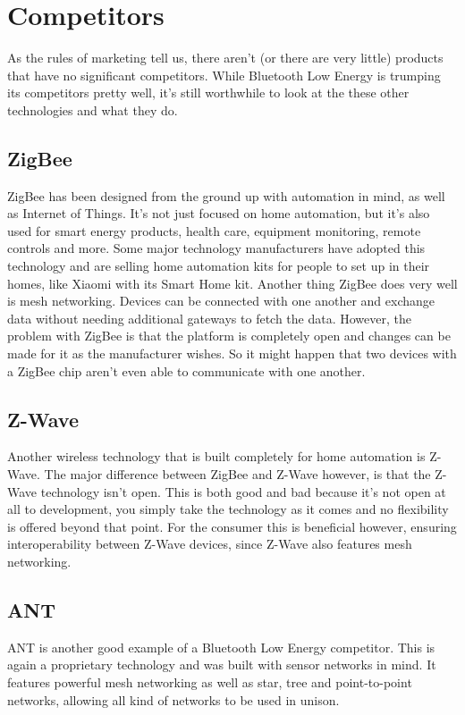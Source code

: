 \documentclass[pdftex,a4paper,12pt,twoside]{report}
\begin{document}
\section{Competitors}
\label{sec:competitors}
As the rules of marketing tell us, there aren't (or there are very little) products that have no significant competitors. While Bluetooth Low Energy is trumping its competitors pretty well, it's still worthwhile to look at the these other technologies and what they do.

\subsection{ZigBee}
\label{subsec:zigbee}
ZigBee has been designed from the ground up with automation in mind, as well as Internet of Things. It's not just focused on home automation, but it's also used for smart energy products, health care, equipment monitoring, remote controls and more. Some major technology manufacturers have adopted this technology and are selling home automation kits for people to set up in their homes, like Xiaomi with its Smart Home kit. Another thing ZigBee does very well is mesh networking. Devices can be connected with one another and exchange data without needing additional gateways to fetch the data. However, the problem with ZigBee is that the platform is completely open and changes can be made for it as the manufacturer wishes. So it might happen that two devices with a ZigBee chip aren't even able to communicate with one another.

\subsection{Z-Wave}
\label{subsec:zwave}
Another wireless technology that is built completely for home automation is Z-Wave. The major difference between ZigBee and Z-Wave however, is that the Z-Wave technology isn't open. This is both good and bad because it's not open at all to development, you simply take the technology as it comes and no flexibility is offered beyond that point. For the consumer this is beneficial however, ensuring interoperability between Z-Wave devices, since Z-Wave also features mesh networking.

\subsection{ANT}
\label{subsec:ant}
ANT is another good example of a Bluetooth Low Energy competitor. This is again a proprietary technology and was built with sensor networks in mind. It features powerful mesh networking as well as star, tree and point-to-point networks, allowing all kind of networks to be used in unison.
\end{document}
